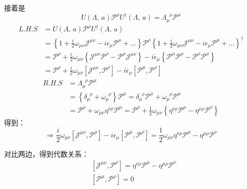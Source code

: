 \noindent
接着是\[{U}(\Lambda,\,a)\mathscr{P}^\rho{U}^\dagger(\Lambda,\,a)
        =\Lambda^{\;\;\rho}_\mu\mathscr{P}^\mu\] \[
        \begin{aligned}
                    L.H.S&={U}(\Lambda,\,a)\mathscr{P}^\rho{U}^\dagger(\Lambda,\,a)\\
                    &=\left\{{1}+\frac{i}{2}\omega_{\mu\nu}\mathscr{J}^{\mu\nu}-i\epsilon_\mu \mathscr{P}^\mu+\ldots\right\}
                    \mathscr{P}^\rho
                    \left\{{1}+\frac{i}{2}\omega_{\mu\nu}\mathscr{J}^{\mu\nu}-i\epsilon_\mu \mathscr{P}^\mu+\ldots\right\}^\dagger\\
                    &=\mathscr{P}^\rho+\frac{i}{2}\omega_{\mu\nu}\left\{ \mathscr{J}^{\mu\nu}\mathscr{P}^\rho-\mathscr{P}^\rho\mathscr{J}^{\mu\nu}\right\}
                     -i\epsilon_\mu\left\{ \mathscr{P}^\mu\mathscr{P}^\rho-\mathscr{P}^\rho\mathscr{P}^\mu\right\}\\    
                    &=\mathscr{P}^\rho+\frac{i}{2}\omega_{\mu\nu}\left[\mathscr{J}^{\mu\nu},\mathscr{P}^\rho\right]
                     -i\epsilon_\mu\left[ \mathscr{P}^\mu,\mathscr{P}^\rho\right]
        \end{aligned}
    \]
    \[
        \begin{aligned}
            R.H.S&=\Lambda^{\;\;\rho}_\mu\mathscr{P}^\mu
            \\&=\left\{\delta_\mu^{\;\;\rho}+\omega_\mu^{\;\;\rho}\right\}\mathscr{P}^\mu
            =\delta_\mu^{\;\;\rho}\mathscr{P}^\mu+\omega_\mu^{\;\;\rho}\mathscr{P}^\mu
            \\&=\mathscr{P}^\rho+\omega_{\mu\nu}\eta^{\nu\rho}\mathscr{P}^\mu
            =\mathscr{P}^\rho+\frac{1}{2}\omega_{\mu\nu}\left\{\eta^{\nu\rho}\mathscr{P}^\mu-\eta^{\mu\rho}\mathscr{P}^\nu\right\}
        \end{aligned}
    \]
得到：
\[
    \Rightarrow \frac{i}{2}\omega_{\mu\nu}\left[\mathscr{J}^{\mu\nu},\mathscr{P}^\rho\right]
    -i\epsilon_\mu\left[ \mathscr{P}^\mu,\mathscr{P}^\rho\right]=
    \frac{1}{2}\omega_{\mu\nu}\eta^{\nu\rho}\mathscr{P}^\mu-\eta^{\mu\rho}\mathscr{P}^\nu
\]

对比两边，得到代数关系：
\begin{subequations}\label{4.5}
        \begin{align}
        &\left[\mathscr{J}^{\mu\nu},\mathscr{P}^\rho\right]=
        \eta^{\nu\rho}\mathscr{P}^\mu-\eta^{\mu\rho}\mathscr{P}^\nu\\
        &\left[ \mathscr{P}^\mu,\mathscr{P}^\rho\right]=0
    \end{align}
\end{subequations}

